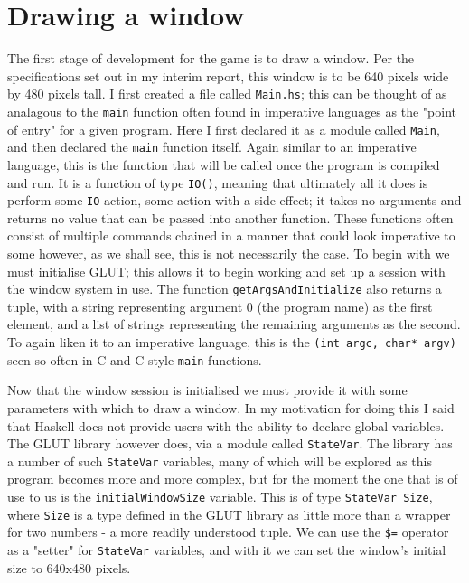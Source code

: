 \documentclass[12pt, a4paper]{report}
\begin{document}
\maketitle

\tableofcontents
\pagebreak

\section{Drawing a window}

The first stage of development for the game is to draw a window.
Per the specifications set out in my interim report, this window is to be 640 pixels wide by 480 pixels tall.
I first created a file called \verb|Main.hs|; this can be thought of as analagous to the \verb|main| function often found in imperative languages as the "point of entry" for a given program.
Here I first declared it as a module called \verb|Main|, and then declared the \verb|main| function itself.
Again similar to an imperative language, this is the function that will be called once the program is compiled and run.
It is a function of type \verb|IO()|, meaning that ultimately all it does is perform some \verb|IO| action, some action with a side effect; it takes no arguments and returns no value that can be passed into another function.
These functions often consist of multiple commands chained in a manner that could look imperative to some however, as we shall see, this is not necessarily the case.
To begin with we must initialise GLUT; this allows it to begin working and set up a session with the window system in use.
The function \verb|getArgsAndInitialize| also returns a tuple, with a string representing argument 0 (the program name) as the first element, and a list of strings representing the remaining arguments as the second.
To again liken it to an imperative language, this is the \verb|(int argc, char* argv)| seen so often in C and C-style \verb|main| functions.

\par

Now that the window session is initialised we must provide it with some parameters with which to draw a window.
In my motivation for doing this I said that Haskell does not provide users with the ability to declare global variables.
The GLUT library however does, via a module called \verb|StateVar|.
The library has a number of such \verb|StateVar| variables, many of which will be explored as this program becomes more and more complex, but for the moment the one that is of use to us is the \verb|initialWindowSize| variable.
This is of type \verb|StateVar Size|, where \verb|Size| is a type defined in the GLUT library as little more than a wrapper for two numbers - a more readily understood tuple.
We can use the \verb|$=| operator as a "setter" for \verb|StateVar| variables, and with it we can set the window's initial size to 640x480 pixels.
\end{document}
